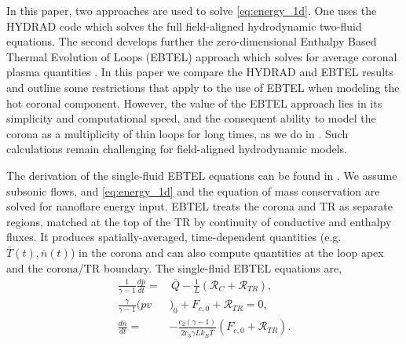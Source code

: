 \documentclass[iop]{emulateapj}
\begin{document}
\par In this paper, two approaches are used to solve \autoref{eq:energy_1d}. One uses the HYDRAD code \citep{bradshaw_influence_2013} which solves the full field-aligned hydrodynamic two-fluid equations. The second develops further the zero-dimensional Enthalpy Based Thermal Evolution of Loops (EBTEL) approach which solves for average coronal plasma quantities \citep{klimchuk_highly_2008,cargill_enthalpy-based_2012,cargill_enthalpy-based_2012-1,cargill_modelling_2015}. In this paper we compare the HYDRAD and EBTEL results and outline some restrictions that apply to the use of EBTEL when modeling the hot coronal component. However, the value of the EBTEL approach lies in its simplicity and computational speed, and the consequent ability to model the corona as a multiplicity of thin loops for long times, as we do in . Such calculations remain challenging for field-aligned hydrodynamic models. 
	\par The derivation of the single-fluid EBTEL equations can be found in \citep{klimchuk_highly_2008,cargill_enthalpy-based_2012}. We assume subsonic flows, and \autoref{eq:energy_1d} and the equation of mass conservation are solved for nanoflare energy input. EBTEL treats the corona and TR as separate regions, matched at the top of the TR by continuity of conductive and enthalpy fluxes. It produces spatially-averaged, time-dependent quantities (e.g. $\bar{T}(t),\bar{n}(t)$) in the corona and can also compute quantities at the loop apex and the corona/TR boundary. The single-fluid EBTEL equations are,
	\begin{align}
		\frac{1}{\gamma - 1}\frac{d\bar{p}}{dt} =& \,\bar{Q} - \frac{1}{L}(\mathcal{R}_C + \mathcal{R}_{TR}), \label{eq:energy_0d} \\
		\frac{\gamma}{\gamma - 1}(pv&)_0 + F_{c,0} + \mathcal{R}_{TR} = 0, \label{eq:tr_energy_0d} \\
		\frac{d\bar{n}}{dt} =& -\frac{c_2(\gamma - 1)}{2c_3\gamma Lk_B\bar{T}}(F_{c,0} + \mathcal{R}_{TR}).\label{eq:mass_0d}
	\end{align}
\end{document}
